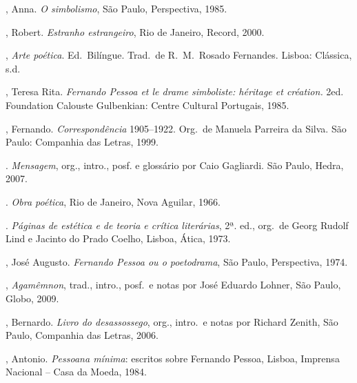 \begin{bibliohedra}

, Anna. \textit{O simbolismo}, São Paulo,
Perspectiva, 1985.

, Robert. \textit{Estranho estrangeiro},
Rio de Janeiro, Record, 2000.

, \textit{Arte poética}. Ed.~Bilíngue. 
Trad.~de R.~M.~Rosado Fernandes. Lisboa: Clássica, s.d.

, Teresa Rita. \textit{Fernando Pessoa et le drame simboliste: héritage et création.}
2\oi ed. Foundation Calouste Gulbenkian: Centre Cultural Portugais, 1985.

, Fernando. \textit{Correspondência}
1905--1922. Org.~de Manuela Parreira da Silva. São Paulo:
Companhia das Letras, 1999. 

\tit{------}. \textit{Mensagem}, org., intro., posf.
e glossário por Caio Gagliardi. São Paulo, Hedra, 2007.

\tit{------}. \textit{Obra poética}, 
Rio de Janeiro,
Nova Aguilar, 1966.

\tit{------}. \textit{Páginas de estética e de teoria e
crítica literárias}, 2ª. ed., org.~de Georg Rudolf Lind e Jacinto do
Prado Coelho, Lisboa, Ática, 1973.

, José Augusto. \textit{Fernando Pessoa ou o
poetodrama}, São Paulo, Perspectiva, 1974.

, \textit{Agamêmnon}, trad., intro., posf.~e notas
por José Eduardo Lohner, São Paulo, Globo, 2009.

, Bernardo. \textit{Livro do desassossego}, org.,
intro.~e notas por Richard Zenith, São Paulo, Companhia das Letras,
2006.

, Antonio. \textit{Pessoana mínima}: escritos
sobre Fernando Pessoa, Lisboa, Imprensa Nacional -- Casa da Moeda,
1984.
\end{bibliohedra}
